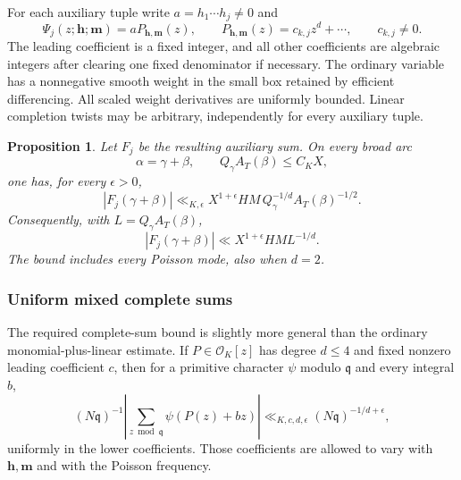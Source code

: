 \documentclass[11pt]{amsart}
\newtheorem{proposition}[theorem]{Proposition}
\theoremstyle{definition}
\numberwithin{equation}{section}
\begin{document}
For each auxiliary tuple write $a=h_1\cdots h_j\ne0$ and
\[
 \Psi_j(z;\mathbf h;\mathbf m)=aP_{\mathbf h,\mathbf m}(z),
 \qquad P_{\mathbf h,\mathbf m}(z)=c_{k,j}z^d+\cdots,
 \qquad c_{k,j}\ne0.
\]
The leading coefficient is a fixed integer, and all other coefficients
are algebraic integers after clearing one fixed denominator if necessary.
The ordinary variable has a nonnegative smooth weight in the small box
retained by efficient differencing.  All scaled weight derivatives are
uniformly bounded.  Linear completion twists may be arbitrary, independently
for every auxiliary tuple.

\begin{proposition}\label{prop:aux-major-24}
Let $F_j$ be the resulting auxiliary sum.  On every broad arc
\[
 \alpha=\gamma+\beta,\qquad Q_\gamma A_T(\beta)\le C_KX,
\]
one has, for every $\epsilon>0$,
\begin{equation}\label{eq:aux-major-strong}
 |F_j(\gamma+\beta)|
 \ll_{K,\epsilon}X^{1+\epsilon}HM\,
            Q_\gamma^{-1/d}A_T(\beta)^{-1/2}.
\end{equation}
Consequently, with $L=Q_\gamma A_T(\beta)$,
\begin{equation}\label{eq:aux-major-height}
 |F_j(\gamma+\beta)|\ll X^{1+\epsilon}HM L^{-1/d}.
\end{equation}
The bound includes every Poisson mode, also when $d=2$.
\end{proposition}

\subsubsection{Uniform mixed complete sums}

The required complete-sum bound is slightly more general than the ordinary
monomial-plus-linear estimate.  If $P\in\mathcal O_K[z]$ has degree
$d\le4$ and fixed nonzero leading coefficient $c$, then for a primitive
character $\psi$ modulo $\mathfrak q$ and every integral $b$,
\begin{equation}\label{eq:aux-complete-general}
 (N\mathfrak q)^{-1}
 \left|\sum_{z\bmod\mathfrak q}\psi(P(z)+bz)\right|
 \ll_{K,c,d,\epsilon}(N\mathfrak q)^{-1/d+\epsilon},
\end{equation}
uniformly in the lower coefficients.  Those coefficients are allowed to
vary with $\mathbf h,\mathbf m$ and with the Poisson frequency.
\end{document}
